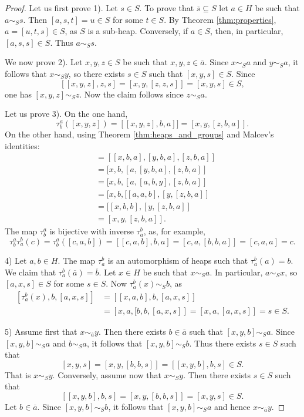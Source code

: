\documentclass{svmult}
\begin{document}
\begin{proof}
    Let us first prove 1). Let $s\in S$. To prove that 
    $\overline{s}\subseteq S$ let 
    $a\in H$ be such that $a\sim_Ss$. Then 
    $[a,s,t]=u\in S$ for some $t\in S$. By Theorem \ref{thm:properties}, 
    $a=[u,t,s]\in S$, as $S$ is a sub-heap. Conversely, 
    if $a\in S$, then, in particular, $[a,s,s]\in S$. Thus 
    $a\sim_Ss$. 

    We now prove 2). Let $x,y,z\in S$ be such that $x,y,z\in\overline{a}$. 
    Since $x\sim_Sa$ and $y\sim_Sa$, it follows that 
    $x\sim_Sy$, so there exists $s\in S$ such that $[x,y,s]\in S$.
    Since  
    \[
    [[x,y,z],z,s]=[x,y,[z,z,s]]=[x,y,s]\in S, 
    \]
    one has $[x,y,z]\sim_Sz$. Now the claim follows since 
    $z\sim_Sa$.
    
    Let us prove 3). On the one hand,
    \[
    \tau_b^a([x,y,z])=[[x,y,z],b,a]]=[x,y,[z,b,a]].
    \]
    On the other hand, using Theorem \ref{thm:heaps_and_groups}
    and Malcev's identities:
    \begin{align*}
        [\tau_b^a(x),\tau_b^a(y),\tau_b^a(z)] &= 
        [[x,b,a],[y,b,a],[z,b,a]]\\
        &=[x,b,[a,[y,b,a],[z,b,a]]\\
        &=[x,b,[a,[a,b,y],[z,b,a]]\\
        &=[x,b,[[a,a,b],[y,[z,b,a]]\\
        &=[[x,b,b],[y,[z,b,a]]\\
        &=[x,y,[z,b,a]].
    \end{align*}
    The map $\tau_b^a$ is bijective with inverse $\tau_a^b$, as, 
    for example, 
    \[
    \tau_b^a\tau_a^b(c)
    =\tau_b^a([c,a,b])=[[c,a,b],b,a]=[c,a,[b,b,a]]=[c,a,a]=c.
    \]
    
    4) Let $a,b\in H$. The map $\tau_a^b$ is an automorphism of heaps
    such that $\tau_a^b(a)=b$. We claim that 
    $\tau_a^b(\overline{a})=\overline{b}$. Let $x\in H$ be such that 
    $x\sim_Sa$. In particular, $a\sim_Sx$, so 
    $[a,x,s]\in S$ for some $s\in S$. Now 
    $\tau_a^b(x)\sim_Sb$, as 
    \begin{align*}
    \left[\tau_a^b(x),b,[a,x,s]\right]&=\left[[x,a,b],b,[a,x,s]\right]\\
    &=\left[x,a,[b,b,[a,x,s]\right]
    =\left[x,a,[a,x,s]\right]=s\in S.
    \end{align*}
    
    5) Assume first that $x\sim_{\overline{a}}y$. Then there exists $b\in\overline{a}$ 
    such that $[x,y,b]\sim_Sa$. Since $[x,y,b]\sim_Sa$ and $b\sim_Sa$, it follows
    that $[x,y,b]\sim_Sb$. Thus there exists $s\in S$
    such that 
    \[
    [x,y,s]=[x,y,[b,b,s]]=[[x,y,b],b,s]\in S.
    \]
    That is $x\sim_Sy$. Conversely, assume now that $x\sim_Sy$. Then 
    there exists $s\in S$ such that 
    \[
    [[x,y,b],b,s]=[x,y,[b,b,s]]=[x,y,s]\in S.
    \]
    Let $b\in\overline{a}$. Since $[x,y,b]\sim_Sb$, it follows that 
    $[x,y,b]\sim_Sa$ and hence $x\sim_{\overline{a}}y$. 
\end{proof}
\end{document}
